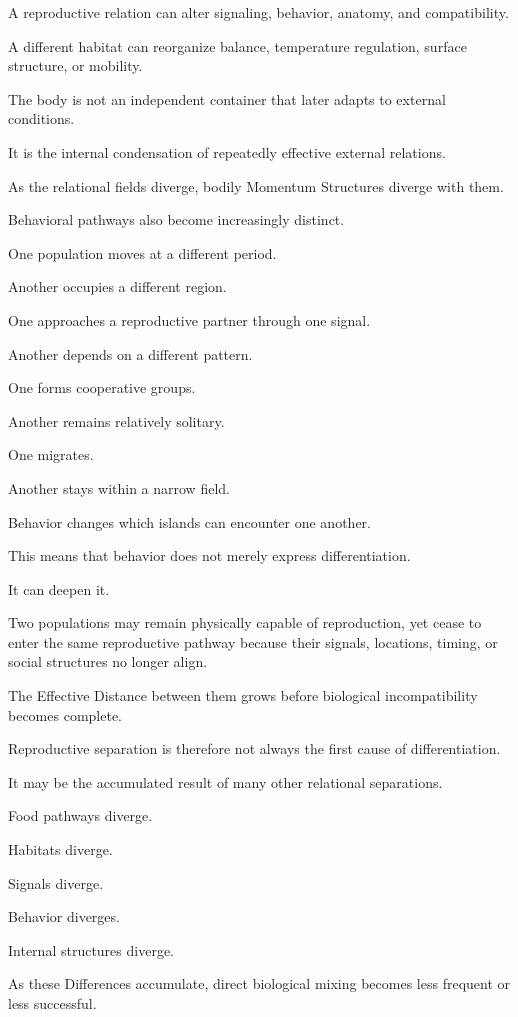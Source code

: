 A reproductive relation can alter signaling, behavior, anatomy, and compatibility.

A different habitat can reorganize balance, temperature regulation, surface structure, or mobility.

The body is not an independent container that later adapts to external conditions.

It is the internal condensation of repeatedly effective external relations.

As the relational fields diverge, bodily Momentum Structures diverge with them.

Behavioral pathways also become increasingly distinct.

One population moves at a different period.

Another occupies a different region.

One approaches a reproductive partner through one signal.

Another depends on a different pattern.

One forms cooperative groups.

Another remains relatively solitary.

One migrates.

Another stays within a narrow field.

Behavior changes which islands can encounter one another.

This means that behavior does not merely express differentiation.

It can deepen it.

Two populations may remain physically capable of reproduction, yet cease to enter the same reproductive pathway because their signals, locations, timing, or social structures no longer align.

The Effective Distance between them grows before biological incompatibility becomes complete.

Reproductive separation is therefore not always the first cause of differentiation.

It may be the accumulated result of many other relational separations.

Food pathways diverge.

Habitats diverge.

Signals diverge.

Behavior diverges.

Internal structures diverge.

As these Differences accumulate, direct biological mixing becomes less frequent or less successful.

